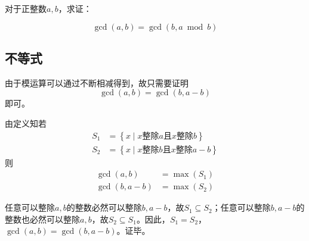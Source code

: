

对于正整数$a, b$，求证：

\[ \gcd(a, b) = \gcd(b, a \bmod b) \]

\subsection{不等式}

由于模运算可以通过不断相减得到，故只需要证明
\[ \gcd(a, b) = \gcd(b, a - b) \]
即可。

由定义知若
\begin{align*}
  S_1 &= \left\{x \mid x\text{整除}a\text{且}x\text{整除}b\right\} \\
  S_2 &= \left\{x \mid x\text{整除}b\text{且}x\text{整除}a - b\right\}
\end{align*}
则
\begin{align*}
  \gcd(a, b) &= \max(S_1) \\
  \gcd(b, a - b) &= \max(S_2)
\end{align*}

任意可以整除$a, b$的整数必然可以整除$b, a - b$，故$S_1 \subseteq S_2$；任意可以整除$b, a - b$的整数也必然可以整除$a, b$，故$S_2 \subseteq S_1$。因此，$S_1 = S_2$，$\gcd(a, b) = \gcd(b, a - b)$。证毕。
